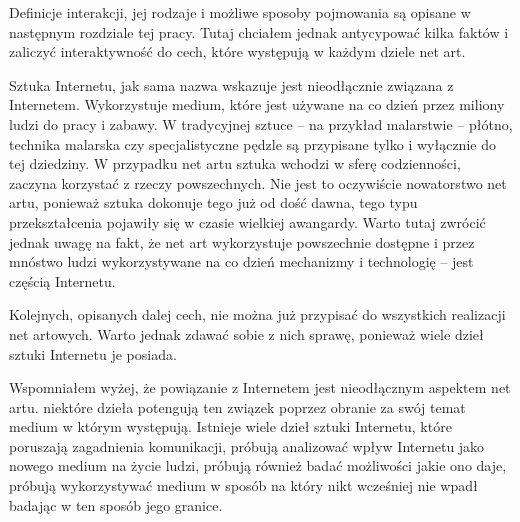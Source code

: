 \documentclass[a4paper,12pt,twoside]{article}
\begin{document}
Definicje interakcji, jej rodzaje i możliwe sposoby pojmowania są opisane
w następnym rozdziale tej pracy. Tutaj chciałem jednak antycypować
kilka faktów i zaliczyć interaktywność do cech, które występują w każdym
dziele net art.

Sztuka Internetu, jak sama nazwa wskazuje jest nieodłącznie związana
z Internetem. Wykorzystuje medium, które jest używane na co dzień
przez miliony ludzi do pracy i zabawy. W tradycyjnej sztuce -- na przykład
malarstwie -- płótno, technika malarska czy specjalistyczne pędzle są
przypisane tylko i wyłącznie do tej dziedziny. W przypadku net artu
sztuka wchodzi w sferę codzienności, zaczyna korzystać z rzeczy powszechnych.
Nie jest to oczywiście nowatorstwo net artu, ponieważ sztuka dokonuje
tego już od dość dawna, tego typu przekształcenia pojawiły się w czasie
wielkiej awangardy. Warto tutaj zwrócić jednak uwagę na fakt, że net
art wykorzystuje powszechnie dostępne i przez mnóstwo ludzi wykorzystywane
na co dzień mechanizmy i technologię -- jest częścią Internetu.

Kolejnych, opisanych dalej cech, nie można już przypisać do wszystkich
realizacji net artowych. Warto jednak zdawać sobie z nich sprawę, ponieważ
wiele dzieł sztuki Internetu je posiada.

Wspomniałem wyżej, że powiązanie z Internetem jest nieodłącznym aspektem
net artu. niektóre dzieła potengują ten związek poprzez obranie za
swój temat medium w którym występują. Istnieje wiele dzieł sztuki
Internetu, które poruszają zagadnienia komunikacji, próbują analizować
wpływ Internetu jako nowego medium na życie ludzi, próbują również
badać możliwości jakie ono daje, próbują wykorzystywać medium w sposób
na który nikt wcześniej nie wpadł badając w ten sposób jego granice.



\end{document}
